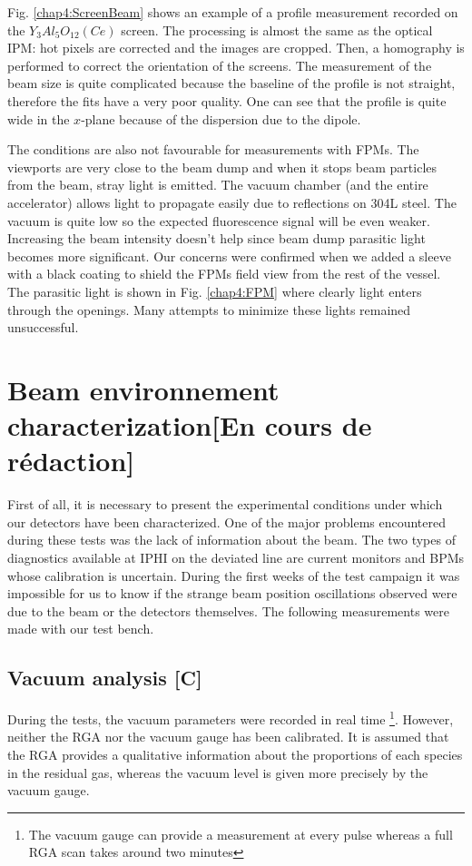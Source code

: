 \begin{refsection}
  Fig. \ref{chap4:ScreenBeam} shows an example of a profile measurement recorded on the $Y_{3}Al_{5}O_{12}(Ce)$ screen. The processing is almost the same as the optical IPM: hot pixels are corrected and the images are cropped. Then, a homography is performed to correct the orientation of the screens. The measurement of the beam size is quite complicated because the baseline of the profile is not straight, therefore the fits have a very poor quality. One can see that the profile is quite wide in the $x$-plane because of the dispersion due to the dipole.

  The conditions are also not favourable for measurements with FPMs. The viewports are very close to the beam dump and when it stops beam particles from the beam, stray light is emitted. The vacuum chamber (and the entire accelerator) allows light to propagate easily due to reflections on 304L steel. The vacuum is quite low so the expected fluorescence signal will be even weaker. Increasing the beam intensity doesn't help since beam dump parasitic light becomes more significant.
  Our concerns were confirmed when we added a sleeve with a black coating to shield the FPMs field view from the rest of the vessel. The parasitic light is shown in Fig. \ref{chap4:FPM} where clearly light enters through the openings. Many attempts to minimize these lights remained unsuccessful.

  

  \section{Beam environnement characterization[En cours de rédaction]}
  First of all, it is necessary to present the experimental conditions under which our detectors have been characterized. One of the major problems encountered during these tests was the lack of information about the beam. The two types of diagnostics available at IPHI on the deviated line are current monitors and BPMs whose calibration is uncertain. During the first weeks of the test campaign it was impossible for us to know if the strange beam position oscillations observed were due to the beam or the detectors themselves. The following measurements were made with our test bench.

  \subsection{Vacuum analysis [C]}
  \label{sec4:vacuum}
  During the tests, the vacuum parameters were recorded in real time \footnote{The vacuum gauge can provide a measurement at every pulse whereas a full RGA scan takes around two minutes}. However, neither the RGA nor the vacuum gauge has been calibrated. It is assumed that the RGA provides a qualitative information about the proportions of each species in the residual gas, whereas the vacuum level is given more precisely by the vacuum gauge.


\end{refsection}
